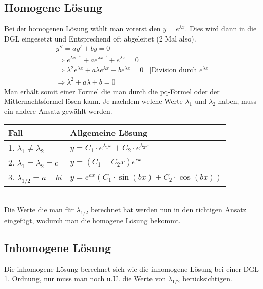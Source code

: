 \documentclass[a4paper,10pt]{scrartcl}
\begin{document}
        \subsection*{Homogene Lösung}
        Bei der homogenen Lösung wählt man vorerst den \(y = e^{\lambda x}\). Dies wird dann in die DGL eingesetzt und Entsprechend oft abgeleitet (2 Mal also).
        \begin{equation}
            \begin{aligned}
                & y'' = a y' + by = 0 \\
                & \Rightarrow e^{\lambda x} \;^{\prime \prime}  + a e^{\lambda x} \;^{\prime} + e^{\lambda x} = 0 \\
                & \Rightarrow \lambda^2 e^{\lambda x}  + a\lambda e^{\lambda x} + be^{\lambda x} = 0 & |\text{Division durch \(e^{\lambda x}\) } \\
                & \Rightarrow \lambda^2 + a \lambda + b = 0
            \end{aligned}
        \end{equation} 
        Man erhält somit einer Formel die man durch die pq-Formel oder der Mitternachtsformel lösen kann. Je nachdem welche Werte \(\lambda_1\) und \(\lambda_2\) haben,
        muss ein andere Ansatz gewählt werden. \\
        \begin{tabular}{|p{3cm}|p{6cm}|}
            \hline 
            Fall & Allgemeine Lösung \\
            \hline
            1. \(\lambda_1 \neq \lambda_2\) & \(y = C_1 \cdot e^{\lambda_1 x} + C_2 \cdot e^{\lambda_2 x}\) \\
            \hline
            2. \(\lambda_1 = \lambda_2 = c\) & \(y = (C_1 + C_2x) e^{cx}\) \\
            \hline
            3. \(\lambda_{1/2} = a + bi \) & \(y = e^{ax}( C_1 \cdot \sin (bx) + C_2 \cdot \cos (bx) )\) \\
            \hline
        \end{tabular} \\
        Die Werte die man für \(\lambda_{1/2}\) berechnet hat werden nun in den richtigen Ansatz eingefügt, wodurch man die homogene Lösung bekommt.  
        
        \subsection*{Inhomogene Lösung}
        Die inhomogene Lösung berechnet sich wie die inhomogene Lösung bei einer DGL 1. Ordnung, nur muss man noch u.U. die Werte von \(\lambda_{1/2}\) berücksichtigen.
    
\end{document}
